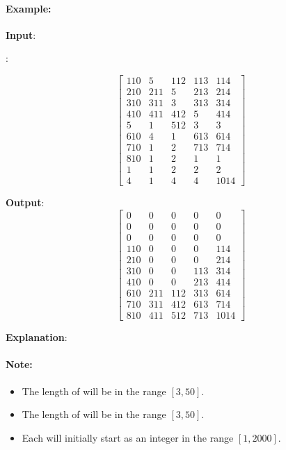 \paragraph{Example:}
\begin{flushleft}


\textbf{Input}:

:

\[
\begin{bmatrix}
110 & 5 & 112 & 113 & 114\\
210 & 211 & 5 & 213 & 214\\
310 & 311 & 3 & 313 & 314\\
410 & 411 & 412 & 5 & 414\\
5 & 1 & 512 & 3 & 3\\
610 & 4 & 1 & 613 & 614\\
710 & 1 & 2 & 713 & 714\\
810 & 1 & 2 & 1 & 1\\
1 & 1 & 2 & 2 & 2\\
4 & 1 & 4 & 4 & 1014
\end{bmatrix}
\]

\textbf{Output}:
\[
\begin{bmatrix}
0 & 0 & 0 & 0 & 0\\
0 & 0 & 0 & 0 & 0\\
0 & 0 & 0 & 0 & 0\\
110 & 0 & 0 & 0 & 114\\
210 & 0 & 0 & 0 & 214\\
310 & 0 & 0 & 113 & 314\\
410 & 0 & 0 & 213 & 414\\
610 & 211 & 112 & 313 & 614\\
710 & 311 & 412 & 613 & 714\\
810 & 411 & 512 & 713 & 1014
\end{bmatrix}
\]

\textbf{Explanation}: 

\end{flushleft}
 

\paragraph{Note:}

\begin{itemize}
\item The length of  will be in the range $[3, 50]$.
\item The length of  will be in the range $[3, 50]$.
\item Each  will initially start as an integer in the range $[1, 2000]$.

\end{itemize}

